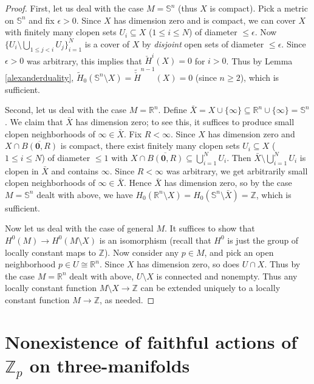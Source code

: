 \documentclass[12pt]{article}
\theoremstyle{plain}
\theoremstyle{definition}
\theoremstyle{remark}
\numberwithin{equation}{section}
\begin{document}
\begin{proof}
First, let us deal with the case $M=\mathbb S^n$ (thus $X$ is compact).  Pick a metric on $\mathbb S^n$ and fix $\epsilon>0$.  Since $X$ has dimension zero and is compact, we can cover $X$ with finitely many clopen sets $U_i\subseteq X$ ($1\leq i\leq N$) of diameter $\leq\epsilon$.  Now $\{U_i\setminus\bigcup_{1\leq j<i}U_j\}_{i=1}^N$ is a cover of $X$ by \emph{disjoint} open sets of diameter $\leq\epsilon$.  Since $\epsilon>0$ was arbitrary, this implies that $\check H^i(X)=0$ for $i>0$.  Thus by Lemma \ref{alexanderduality}, $\tilde H_0(\mathbb S^n\setminus X)=\tilde{\check H}^{n-1}(X)=0$ (since $n\geq 2$), which is sufficient.

Second, let us deal with the case $M=\mathbb R^n$.  Define $\bar X=X\cup\{\infty\}\subseteq\mathbb R^n\cup\{\infty\}=\mathbb S^n$.  We claim that $\bar X$ has dimension zero; to see this, it suffices to produce small clopen neighborhoods of $\infty\in\bar X$.  Fix $R<\infty$.  Since $X$ has dimension zero and $X\cap\overline{B(\mathbf 0,R)}$ is compact, there exist finitely many clopen sets $U_i\subseteq X$ ($1\leq i\leq N$) of diameter $\leq 1$ with $X\cap\overline{B(\mathbf 0,R)}\subseteq\bigcup_{i=1}^NU_i$.  Then $\bar X\setminus\bigcup_{i=1}^NU_i$ is clopen in $\bar X$ and contains $\infty$.  Since $R<\infty$ was arbitrary, we get arbitrarily small clopen neighborhoods of $\infty\in\bar X$.  Hence $\bar X$ has dimension zero, so by the case $M=\mathbb S^n$ dealt with above, we have $H_0(\mathbb R^n\setminus X)=H_0(\mathbb S^n\setminus\bar X)=\mathbb Z$, which is sufficient.

Now let us deal with the case of general $M$.  It suffices to show that $H^0(M)\to H^0(M\setminus X)$ is an isomorphism (recall that $H^0$ is just the group of locally constant maps to $\mathbb Z$).  Now consider any $p\in M$, and pick an open neighborhood $p\in U\cong\mathbb R^n$.  Since $X$ has dimension zero, so does $U\cap X$.  Thus by the case $M=\mathbb R^n$ dealt with above, $U\setminus X$ is connected and nonempty.  Thus any locally constant function $M\setminus X\to\mathbb Z$ can be extended uniquely to a locally constant function $M\to\mathbb Z$, as needed.
\end{proof}

\section{Nonexistence of faithful actions of $\mathbb Z_p$ on three-manifolds}
\end{document}
